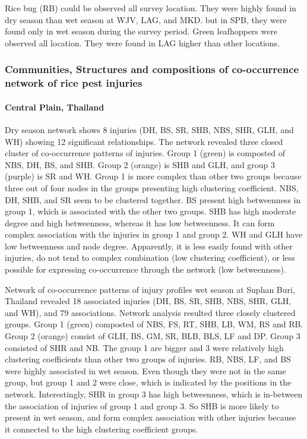 Rice bug (RB) could be observed all survey location. They were highly found in dry season than wet season at WJV, LAG, and MKD. but in SPB, they were found only in wet season during the survey period.  Green leafhoppers were observed all location. They were found in LAG higher than other locations.

\subsubsection{Communities, Structures and compositions of co-occurrence network of rice pest injuries}

\paragraph{Central Plain, Thailand}

Dry season network shows 8 injuries (DH, BS, SR, SHB, NBS, SHR, GLH, and WH) showing 12 significant relationships. The network revealed three closed cluster of co-occurrence patterns of injuries. Group 1 (green) is composted of NBS, DH, BS, and SHB. Group 2 (orange) is SHB and GLH, and group 3 (purple) is SR and WH. Group 1 is more complex than other two groups because three out of four nodes in the groups presenting high clustering coefficient. NBS, DH, SHB, and SR seem to be clustered together. BS present high betweenness in group 1, which is associated with the other two groups. SHB has high moderate degree and high betweenness, whereas it has low betweenness.  It can form complex association with the injuries in group 1 and group 2.  WH and GLH have low betweenness and node degree. Apparently, it is less easily found with other injuries, do not tend to complex combination (low clustering coefficient), or less possible for expressing co-occurrence through the network (low betweenness). 

Network of co-occurrence patterns of injury profiles wet season at Suphan Buri, Thailand revealed 18 associated injuries (DH, BS, SR, SHB, NBS, SHR, GLH, and WH), and 79 associations. Network analysis resulted three closely clustered groups. Group 1 (green) composted of NBS, FS, RT, SHB, LB, WM, RS and RB. Group 2 (orange) consist of GLH, BS, GM, SR, BLB, BLS, LF and DP. Group 3 consisted of SHR and NB. The group 1 are bigger and 3 were relatively high clustering coefficients than other two groups of injuries. RB, NBS, LF, and BS were highly associated in wet season. Even though they were not in the same group, but group 1 and 2 were close, which is indicated by the positions in the network. Interestingly, SHR in group 3 has high betweenness, which is in-between the association of injuries of group 1 and group 3. So SHB is more likely to present in wet season, and form complex association with other injuries because it connected to the high clustering coefficient groups.

